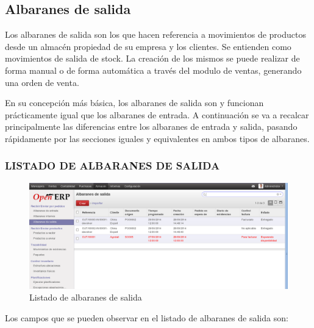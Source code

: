 \subsection{Albaranes de salida}
Los albaranes de salida son los que hacen referencia a movimientos de productos desde un almacén propiedad de su empresa y los clientes. Se entienden como movimientos de salida de stock. La creación de los mismos se puede realizar de forma manual o de forma automática a través del modulo de ventas, generando una orden de venta.

En su concepción más básica, los albaranes de salida son y funcionan prácticamente igual que los albaranes de entrada. A continuación se va a recalcar principalmente las diferencias entre los albaranes de entrada y salida, pasando rápidamente por las secciones iguales y equivalentes en ambos tipos de albaranes.

\subsubsection{LISTADO DE ALBARANES DE SALIDA}
\label{almacen:envio}

\begin{figure}[H]
\includegraphics[width=\textwidth]{almacen/img/alb_salida.png}
\caption{Listado de albaranes de salida}
\label{al:listasalida}
\end{figure}

Los campos que se pueden observar en el listado de albaranes de salida son:

